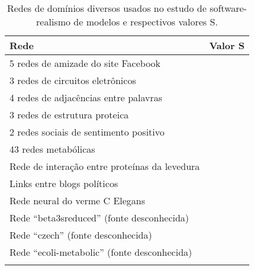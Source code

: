 \begin{center}
\begin{longtable}{| p{10cm} | c |}
	\hline
	\textbf{Rede} & \textbf{Valor} S \\ \hline
	\hline
	5 redes de amizade do site Facebook \cite{Traud2008} & \\ \hline
	3 redes de circuitos eletrônicos \cite{Milo2004} & \\ \hline
	4 redes de adjacências entre palavras \cite{Milo2004} & \\ \hline
	3 redes de estrutura proteica \cite{Milo2004} & \\ \hline
	2 redes sociais de sentimento positivo \cite{Milo2004} & \\ \hline
	43 redes metabólicas \cite{Jeong2000} & \\ \hline
	Rede de interação entre proteínas da levedura \cite{Jeong2001} & \\ \hline
	Links entre blogs políticos \cite{Adamic2005} & \\ \hline
	Rede neural do verme C Elegans \cite{Watts1998} & \\ \hline
	Rede ``beta3sreduced'' (fonte desconhecida) & \\ \hline
	Rede ``czech'' (fonte desconhecida) & \\  \hline
	Rede ``ecoli-metabolic'' (fonte desconhecida) & \\ \hline
	
	\caption{\label{tab:redes-outros}Redes de domínios diversos usados no estudo de software-realismo de modelos e respectivos valores S.}
\end{longtable}
\end{center}

